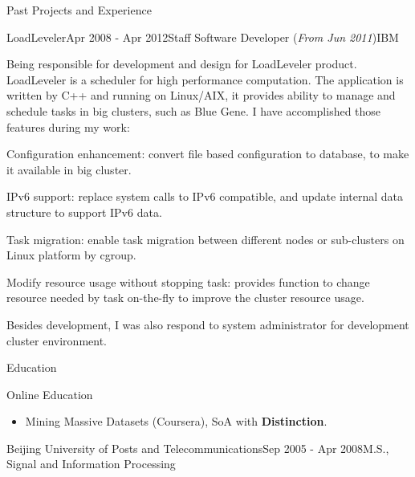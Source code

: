\documentclass{resume} %
\begin{document}
\begin{rSection}{Past Projects and Experience}
\begin{rSubsection}{LoadLeveler}{Apr 2008 - Apr 2012}{Staff Software Developer (\textit{From Jun 2011})}{IBM}

Being responsible for development and design for LoadLeveler product. LoadLeveler is a scheduler for high performance computation. The application is written by C++ and running on Linux/AIX, it provides ability to manage and schedule tasks in big clusters, such as Blue Gene. I have accomplished those features during my work:

\begin{rSubsectionList}
\item Configuration enhancement: convert file based configuration to database, to make it available in big cluster.
\item IPv6 support: replace system calls to IPv6 compatible, and update internal data structure to support IPv6 data.
\item Task migration: enable task migration between different nodes or sub-clusters on Linux platform by cgroup.
\item Modify resource usage without stopping task: provides function to change resource needed by task on-the-fly to improve the cluster resource usage.
\end{rSubsectionList}\vspace{-1.5em}

Besides development, I was also respond to system administrator for development cluster environment.
\end{rSubsection}
\vspace{1.8em}

\begin{rSection}{Education}
\begin{rSubsection}{Online Education}{}{}{}
  \begin{itemize}\vspace{-0.6em}
    \item Mining Massive Datasets (Coursera), SoA with \textbf{Distinction}.
  \end{itemize}
\end{rSubsection}

\begin{rSubsection}{Beijing University of Posts and Telecommunications}{Sep 2005 - Apr 2008}{M.S., Signal and Information Processing}{}
\end{rSubsection}


\end{rSection}
\end{rSection}
\end{document}
